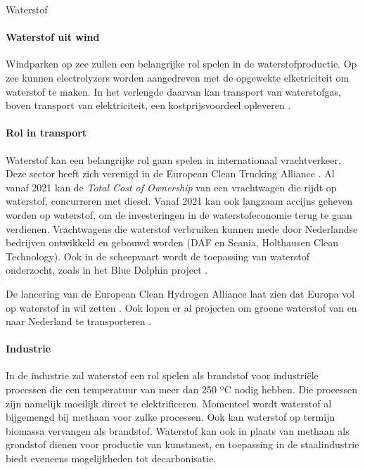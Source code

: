 \begin{voorstel}{Waterstof}
\begin{multicols*}{2}
\begin{overwegingen}
\paragraph{Waterstof uit wind}
Windparken op zee zullen een belangrijke rol spelen in de waterstofproductie. Op zee kunnen electrolyzers worden aangedreven met de opgewekte elketriciteit om waterstof te maken. In het verlengde daarvan kan transport van waterstofgas, boven transport van elektriciteit, een kostprijsvoordeel opleveren \parencite{hygro_enabling_nodate}.

\paragraph{Rol in transport}
Waterstof kan een belangrijke rol gaan spelen in internationaal vrachtverkeer. Deze sector heeft zich verenigd in de European Clean Trucking Alliance \parencite{european_clean_trucking_alliance_europes_2020}.
Al vanaf 2021 kan de \emph{Total Cost of Ownership} van een vrachtwagen die rijdt op waterstof, concurreren met diesel.
Vanaf 2021 kan ook langzaam accijns geheven worden op waterstof, om de investeringen in de waterstofeconomie terug te gaan verdienen. Vrachtwagens die waterstof verbruiken kunnen mede door Nederlandse bedrijven ontwikkeld en gebouwd worden (DAF en Scania, Holthausen Clean Technology).
Ook in de scheepvaart wordt de toepassing van waterstof onderzocht, zoals in het Blue Dolphin project \parencite{hydrogen_for_climate_action_blue_2020}.

De lancering van de European Clean Hydrogen Alliance  laat zien dat Europa vol op waterstof in wil zetten \parencite{european_clean_hydrogen_alliance_mission_nodate}.
Ook lopen er al projecten om groene waterstof van en naar Nederland te transporteren \parencite{hydrogen_for_climate_action_green_2020,hydrogen_for_climate_action_green_2020-1, hydrogen_for_climate_action_h2go_2020}.

\paragraph{Industrie}
In de industrie zal waterstof een rol spelen als brandstof voor industriële processen die een temperatuur van meer dan 250 ºC nodig hebben. Die processen zijn namelijk moeilijk direct te elektrificeren. Momenteel wordt waterstof al bijgemengd bij methaan voor zulke processen. Ook kan waterstof op termijn biomassa vervangen als brandstof. Waterstof kan ook in plaats van methaan als grondstof dienen voor productie van kunstmest, en toepassing in de staalindustrie biedt eveneens mogelijkheden tot decarbonisatie.


\end{overwegingen}
\end{multicols*}
\end{voorstel}
